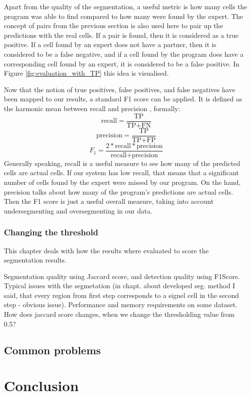 \documentclass[
  digital,     %
  oneside,     %
  nosansbold,  %
  nocolorbold, %
  lof,         %
  lot,         %
]{fithesis4}
\begin{document}
Apart from the quality of the segmentation, a useful metric is how many cells
the program was able to find compared to how many were found by the expert. The
concept of pairs from the previous section is also used here to pair up the
predictions with the real cells. If a pair is found, then it is considered as a
true positive. If a cell found by an expert does not have a partner, then it is
considered to be a false negative, and if a cell found by the program does have
a corresponding cell found by an expert, it is considered to be a false
positive. In Figure \ref{fig:evaluation_with_TP} this idea is visualised.

Now that the notion of true positives, false positives, and false negatives have
been mapped to our results, a standard F1 score can be applied. It is defined as
the harmonic mean between recall and precision \cite{sklearn-f1score}, formally:
$$\text{recall} = \frac{\text{TP}}{\text{TP} + \text{FN}}$$
$$\text{precision} = \frac{\text{TP}}{\text{TP} + \text{FP}}$$
$$F_1 = \frac{2 * \text{recall} * \text{precision}}{\text{recall} +
\text{precision}}$$
Generally speaking, recall is a useful measure to see how many of the predicted
cells are actual cells. If our system has low recall, that means that a
significant number of cells found by the expert were missed by our program. On
the hand, precision talks about how many of the program's predictions are actual
cells. Then the F1 score is just a useful overall measure, taking into account
undersegmenting and oversegmenting in our data.


\subsection{Changing the threshold}



This chapter deals with how the results where evaluated to score the
segmentation results.

Segmentation quality using Jaccard score, and detection quality using F1Score.
Typical issues with the segmetation (in chapt. about developed seg. method I
said, that every region from first step corresponds to a signel cell in the
second step - obvious issue). Performance and memory requirements on some
dataset. How does jaccard score changes, when we change the thresholding value
from 0.5?

\section{Common problems}

\chapter{Conclusion}
\end{document}
